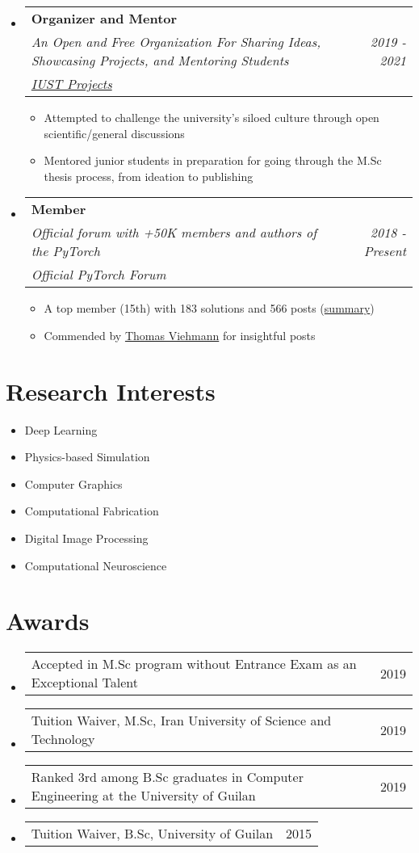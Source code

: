 \documentclass[letterpaper,11pt]{article}
\makeatletter
\newcommand{\resumeItem}[1]{
  \item\small{
    {#1 \vspace{-2pt}}
  }
}
\newcommand{\resumeSubheading}[5]{
  \item
    \begin{tabular*}{0.97\textwidth}{l@{\extracolsep{\fill}}r}
      \textbf{#1} & #2 \\ 
      \textit{\small#3} & \textit{\small #4} \\
      \textit{#5} & 
    \end{tabular*}\vspace{-5pt}
}
\newcommand{\awarditem}[2]{
  \item
    \begin{tabular*}{0.97\textwidth}{l@{\extracolsep{\fill}}r}
      #1 & #2 \\ 
    \end{tabular*}\vspace{-5pt}
}
\newcommand{\resumeSubHeadingListStart}{\begin{itemize}[leftmargin=*]}
\newcommand{\resumeSubHeadingListEnd}{\end{itemize}}
\newcommand{\resumeItemListStart}{\begin{itemize}}
\newcommand{\resumeItemListEnd}{\end{itemize}\vspace{-5pt}}
\newcommand{\awarditemListStart}{\begin{itemize}[leftmargin=*]}
\newcommand{\awarditemListEnd}{\end{itemize}\vspace{-5pt}}
\makeatother
\begin{document}
  \resumeSubHeadingListStart
    \resumeSubheading
      {Organizer and Mentor}{}
      {An Open and Free Organization For Sharing Ideas, Showcasing Projects, and Mentoring Students} 
      {2019 - 2021}{\href{http://iust-projects.ir/}{IUST Projects}}
      \resumeItemListStart
        \resumeItem{Attempted to challenge the university's siloed culture through open scientific/general discussions}
        \resumeItem{Mentored junior students in preparation for going through the M.Sc thesis process, from ideation to publishing}
      \resumeItemListEnd
  \resumeSubHeadingListEnd

  \resumeSubHeadingListStart
    \resumeSubheading
      {Member}{}
      {Official forum with +50K members and authors of the PyTorch} 
      {2018 - Present}{{Official PyTorch Forum}}
      \resumeItemListStart
        \resumeItem{A top member (15th) with 183 solutions and 566 posts (\href{https://discuss.pytorch.org/u/Nikronic/}{summary})}
        \resumeItem{Commended by \href{https://twitter.com/ThomasViehmann/status/1309794697049714689}{Thomas Viehmann} for insightful posts}
      \resumeItemListEnd
  \resumeSubHeadingListEnd

\section{Research Interests}
  \resumeSubHeadingListStart
    \resumeItem{Deep Learning}
    \vspace{-5pt}
    \resumeItem{Physics-based Simulation}
    \vspace{-5pt}
    \resumeItem{Computer Graphics} 
    \vspace{-5pt}
    \resumeItem{Computational Fabrication}
    \vspace{-5pt}
    \resumeItem{Digital Image Processing}
    \vspace{-5pt}
    \resumeItem{Computational Neuroscience}
  \resumeSubHeadingListEnd

\section{Awards}
\awarditemListStart
  \awarditem{Accepted in M.Sc program without Entrance Exam as an Exceptional Talent}{2019}
  \awarditem{Tuition Waiver, M.Sc, Iran University of Science and Technology}{2019}
  \awarditem{Ranked 3rd among B.Sc graduates in Computer Engineering at the University of Guilan}{2019}
  \awarditem{Tuition Waiver, B.Sc, University of Guilan}{2015}
\awarditemListEnd
\end{document}
